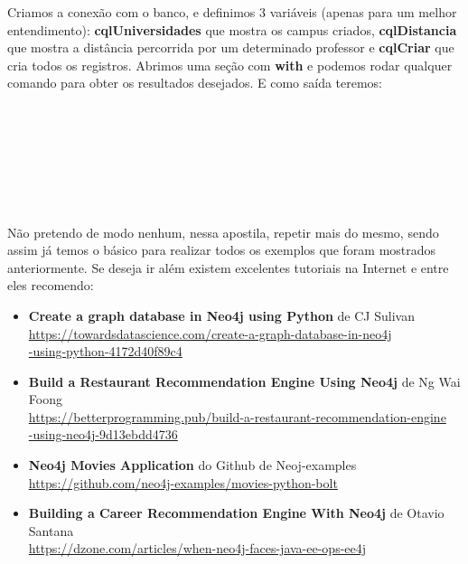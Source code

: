 Criamos a conexão com o banco, e definimos 3 variáveis (apenas para um melhor entendimento): \textbf{cqlUniversidades} que mostra os campus criados, \textbf{cqlDistancia} que mostra a distância percorrida por um determinado professor e \textbf{cqlCriar} que cria todos os registros. Abrimos uma seção com \textbf{with} e podemos rodar qualquer comando para obter os resultados desejados. E como saída teremos: \\
 \\
 \\
 \\

 \\
 \\
 \\

Não pretendo de modo nenhum, nessa apostila, repetir mais do mesmo, sendo assim já temos o básico para realizar todos os exemplos que foram mostrados anteriormente. Se deseja ir além existem excelentes tutoriais na Internet e entre eles recomendo: \vspace{-1em}
\begin{itemize}
	\item \textbf{Create a graph database in Neo4j using Python} de CJ Sulivan \\ \url{https://towardsdatascience.com/create-a-graph-database-in-neo4j} \\ 
	\url{-using-python-4172d40f89c4}
	\item \textbf{Build a Restaurant Recommendation Engine Using Neo4j} de Ng Wai Foong \\ \url{https://betterprogramming.pub/build-a-restaurant-recommendation-engine} \\
	\url{-using-neo4j-9d13ebdd4736}
	\item \textbf{Neo4j Movies Application} do  Github de Neoj-examples \\
	\url{https://github.com/neo4j-examples/movies-python-bolt}
	\item \textbf{Building a Career Recommendation Engine With Neo4j} de Otavio Santana \\ \url{https://dzone.com/articles/when-neo4j-faces-java-ee-ops-ee4j}
\end{itemize}
